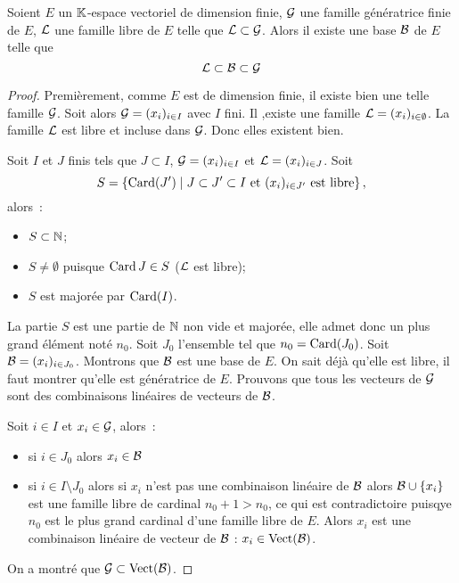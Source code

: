 \begin{theo}
  Soient \(E\) un \(\mathbb{K}\)-espace vectoriel de dimension finie, \(\mathcal{G}\) une famille génératrice finie de \(E\), \(\mathcal{L}\) une famille libre de \(E\) telle que \(\mathcal{L} \subset \mathcal{G}\). Alors il existe une base \(\mathcal{B}\) de \(E\) telle que
  \begin{equation}
    \mathcal{L} \subset \mathcal{B} \subset \mathcal{G}
  \end{equation}
\end{theo}
\begin{proof}
  Premièrement, comme \(E\) est de dimension finie, il existe bien une telle famille \(\mathcal{G}\). Soit alors \(\mathcal{G}=(x_i)_{i \in I}\) avec \(I\) fini. Il ,existe une famille \(\mathcal{L}=(x_i)_{i \in \emptyset}\). La famille \(\mathcal{L}\) est libre et incluse dans \(\mathcal{G}\). Donc elles existent bien.

  Soit \(I\) et \(J\) finis tels que \(J \subset I\), \(\mathcal{G}=(x_i)_{i \in I}\) et \(\mathcal{L}=(x_i)_{i \in J}\). Soit
  \begin{equation}
    S = \left\{\operatorname{Card}(J')\mathrel{}\middle|\mathrel{}J \subset J' \subset I \text{~et } (x_i)_{i \in J'} \text{~est libre}\right\},
  \end{equation}
  alors~:
  \begin{itemize}
  \item \(S \subset \mathbb{N}\);
  \item \(S \neq \emptyset\) puisque \(\operatorname{Card} J \in S\) (\(\mathcal{L}\) est libre);
  \item \(S\) est majorée par \(\operatorname{Card}(I)\).
  \end{itemize}
  La partie \(S\) est une partie de \(\mathbb{N}\) non vide et majorée, elle admet donc un plus grand élément noté \(n_0\). Soit \(J_0\) l'ensemble tel que \(n_0=\operatorname{Card}(J_0)\). Soit \(\mathcal{B}=(x_i)_{i \in J_0}\). Montrons que \(\mathcal{B}\) est une base de \(E\). On sait déjà qu'elle est libre, il faut montrer qu'elle est génératrice de \(E\). Prouvons que tous les vecteurs de \(\mathcal{G}\) sont des combinaisons linéaires de vecteurs de \(\mathcal{B}\). 

  Soit \(i \in I\) et \(x_i \in \mathcal{G}\), alors~:
  \begin{itemize}
  \item si \(i \in J_0\) alors \(x_i \in \mathcal{B}\)
  \item si \(i \in I\setminus J_0\) alors si \(x_i\) n'est pas une combinaison linéaire de \(\mathcal{B}\) alors \(\mathcal{B} \cup \{x_i\}\) est une famille libre de cardinal \(n_0+1 >n_0\), ce qui est contradictoire puisqye \(n_0\) est le plus grand cardinal d'une famille libre de \(E\). Alors \(x_i\) est une combinaison linéaire de vecteur de \(\mathcal{B}\) : \(x_i \in \operatorname{Vect}(\mathcal{B})\).
  \end{itemize}
  On a montré que \(\mathcal{G} \subset \operatorname{Vect}(\mathcal{B})\).


\end{proof}
